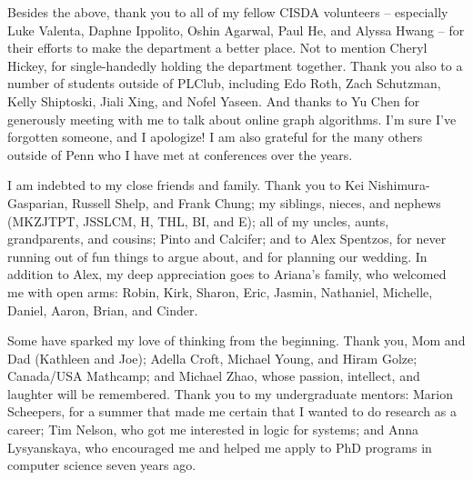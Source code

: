 Besides the above, thank you to all of my fellow CISDA volunteers -- especially Luke Valenta, Daphne Ippolito, Oshin Agarwal, Paul He, and Alyssa Hwang -- for their efforts to make the department a better place.
Not to mention Cheryl Hickey, for single-handedly holding the department together.
Thank you also to a number of students outside of PLClub, including
Edo Roth, Zach Schutzman, Kelly Shiptoski, Jiali Xing, and Nofel Yaseen.
And thanks to Yu Chen for generously meeting with me to talk about online graph algorithms.
I'm sure I've forgotten someone, and I apologize!
I am also grateful for the many others outside of Penn who I have met at conferences over the years.

I am indebted to my close friends and family. Thank you to Kei Nishimura-Gasparian, Russell Shelp, and Frank Chung; my siblings, nieces, and nephews (MKZJTPT, JSSLCM, H, THL, BI, and E); all of my uncles, aunts, grandparents, and cousins; Pinto and Calcifer; and to Alex Spentzos, for never running out of fun things to argue about, and for planning our wedding. In addition to Alex, my deep appreciation goes to Ariana's family, who welcomed me with open arms: Robin, Kirk, Sharon, Eric, Jasmin, Nathaniel, Michelle, Daniel, Aaron, Brian, and Cinder.

Some have sparked my love of thinking from the beginning.
Thank you, Mom and Dad (Kathleen and Joe);
Adella Croft, Michael Young, and Hiram Golze;
Canada/USA Mathcamp;
and Michael Zhao,
whose passion, intellect, and laughter will be remembered.
Thank you to my undergraduate mentors: Marion Scheepers, for a summer that made me certain that I wanted to do research as a career;
Tim Nelson, who got me interested in logic for systems;
and Anna Lysyanskaya, who encouraged me and helped me apply to PhD programs in computer science seven years ago.

